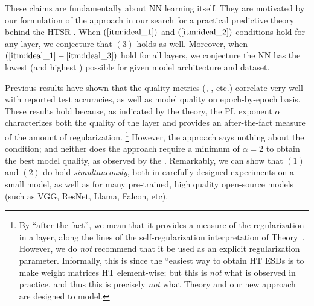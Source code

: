 These claims are fundamentally about NN learning itself. 
They are motivated by our formulation of the \SETOL approach in our search for a practical predictive theory behind the HTSR \Phenomenology.
When $(\ref{itm:ideal_1})$ and $(\ref{itm:ideal_2})$ conditions hold for any layer, we conjecture that $(3)$ holds as well.
Moreover, when $(\ref{itm:ideal_1}-\ref{itm:ideal_3})$ hold for all layers, we conjecture the
NN has the lowest \GeneralizationError (and highest \ModelQuality) possible for given model architecture and dataset.

Previous results have shown that the \HTSR quality metrics (\ALPHA,  \ALPHAHAT, etc.)  correlate very well with reported test accuracies,
as well as model quality on epoch-by-epoch basis.
These results hold because, as indicated by the \HTSR theory, the PL exponent $\alpha$ characterizes both the quality of the layer and provides an after-the-fact measure of the amount of regularization.%
\footnote{By ``after-the-fact'', we mean that it provides a measure of the regularization in a layer, along the lines of the self-regularization interpretation of \HTSR Theory~\cite{MM18_TR_JMLRversion}. However, we do \emph{not} recommend that it be used as an explicit regularization parameter. Informally, this is since the ``easiest way to obtain HT ESDs is to make weight matrices HT element-wise; but this is \emph{not} what is observed in practice, and thus this is precisely \emph{not} what \HTSR Theory and our new \SETOL approach are designed to model.}
However, the \HTSR approach says nothing about the \SETOL \TRACELOG condition; and neither does the \SETOL approach require a minimum of $\alpha=2$ to obtain the best model quality, as observed by the \HTSR \Phenomenology.
Remarkably, we can show that $(1)$ and $(2)$ do hold \emph{simultaneously}, both in carefully designed experiments on a small model,
as well as for many pre-trained, high quality open-source models (such as VGG, ResNet, Llama, Falcon, etc). 



